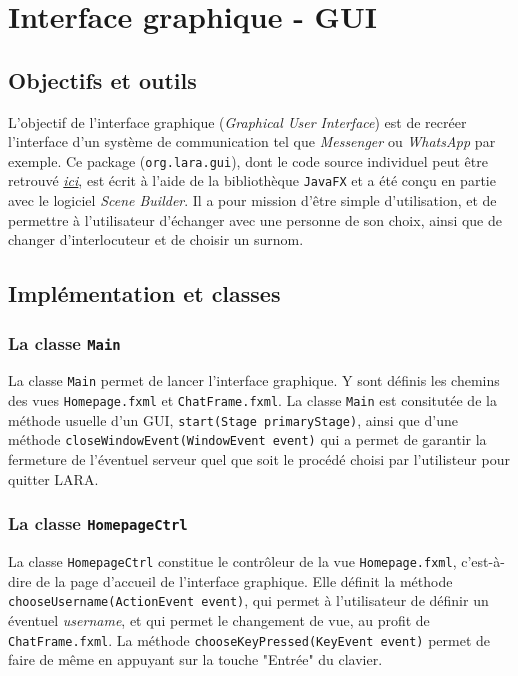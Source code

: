 \documentclass[10pt,a4paper]{article}
\begin{document}
\section{Interface graphique - GUI}
\subsection{Objectifs et outils}

L'objectif de l'interface graphique (\textit{Graphical User Interface}) est de recréer l'interface d'un système de communication tel que \textit{Messenger} ou \textit{WhatsApp} par exemple. Ce package (\texttt{org.lara.gui}), dont le code source individuel peut être retrouvé \href{https://github.com/LaraProject/GUI}{\textit{ici}}, est écrit à l'aide de la bibliothèque \texttt{JavaFX} et a été conçu en partie avec le logiciel \textit{Scene Builder}. Il a pour mission d'être simple d'utilisation, et de permettre à l'utilisateur d'échanger avec une personne de son choix, ainsi que de changer d'interlocuteur et de choisir un surnom. 

\subsection{Implémentation et classes}
\subsubsection{La classe \texttt{Main}}

La classe \texttt{Main} permet de lancer l'interface graphique. Y sont définis les chemins des vues \texttt{Homepage.fxml} et \texttt{ChatFrame.fxml}. La classe \texttt{Main} est consitutée de la méthode usuelle d'un GUI, \texttt{start(Stage primaryStage)}, ainsi que d'une méthode \texttt{closeWindowEvent(WindowEvent event)} qui a permet de garantir la fermeture de l'éventuel serveur quel que soit le procédé choisi par l'utilisteur pour quitter LARA.

\subsubsection{La classe \texttt{HomepageCtrl}}

La classe \texttt{HomepageCtrl} constitue le contrôleur de la vue \texttt{Homepage.fxml}, c'est-à-dire de la page d'accueil de l'interface graphique. Elle définit la méthode \texttt{chooseUsername(ActionEvent event)}, qui permet à l'utilisateur de définir un éventuel \textit{username}, et qui permet le changement de vue, au profit de \texttt{ChatFrame.fxml}. La méthode \texttt{chooseKeyPressed(KeyEvent event)} permet de faire de même en appuyant sur la touche "Entrée" du clavier.
\end{document}
